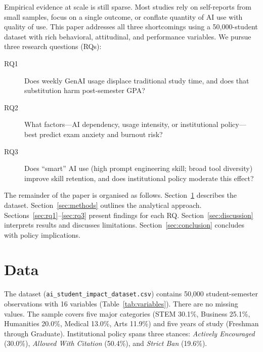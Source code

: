 \documentclass[11pt]{article}
\begin{document}
Empirical evidence at scale is still sparse. Most studies rely on self-reports
from small samples, focus on a single outcome, or conflate quantity of AI use
with quality of use. This paper addresses all three shortcomings using a
50{,}000-student dataset with rich behavioral, attitudinal, and performance
variables. We pursue three research questions (RQs):

\begin{description}
  \item[RQ1] Does weekly GenAI usage displace traditional study time, and does
    that substitution harm post-semester GPA?
  \item[RQ2] What factors---AI dependency, usage intensity, or institutional
    policy---best predict exam anxiety and burnout risk?
  \item[RQ3] Does ``smart'' AI use (high prompt engineering skill; broad tool
    diversity) improve skill retention, and does institutional policy moderate
    this effect?
\end{description}

The remainder of the paper is organised as follows. Section~\ref{sec:data}
describes the dataset. Section~\ref{sec:methods} outlines the analytical
approach. Sections~\ref{sec:rq1}--\ref{sec:rq3} present findings for each RQ.
Section~\ref{sec:discussion} interprets results and discusses limitations.
Section~\ref{sec:conclusion} concludes with policy implications.

\section{Data}
\label{sec:data}

The dataset (\texttt{ai\_student\_impact\_dataset.csv}) contains 50{,}000
student-semester observations with 16 variables (Table~\ref{tab:variables}).
There are no missing values. The sample covers five major categories (STEM
30.1\%, Business 25.1\%, Humanities 20.0\%, Medical 13.0\%, Arts 11.9\%) and
five years of study (Freshman through Graduate). Institutional policy spans three
stances: \emph{Actively Encouraged} (30.0\%), \emph{Allowed With Citation}
(50.4\%), and \emph{Strict Ban} (19.6\%).
\end{document}
